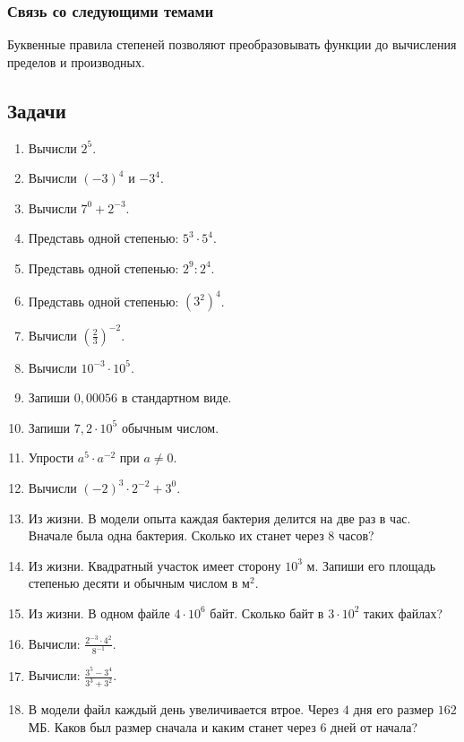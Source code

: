 \documentclass[12pt,a4paper]{article}
\theoremstyle{definition}
\theoremstyle{plain}
\theoremstyle{remark}
\newcommand{\starmark}{\ensuremath{{}^{\ast}}}
\begin{document}
\subsubsection*{Связь со следующими темами}
Буквенные правила степеней позволяют преобразовывать функции до вычисления пределов и производных.
\subsection*{Задачи}
\begin{enumerate}[label=\thesection.\arabic*.,leftmargin=2.8em,itemsep=12pt]
\item Вычисли \(2^{5}\).
\item Вычисли \((- 3)^{4}\) и \(- 3^{4}\).
\item Вычисли \(7^{0} + 2^{- 3}\).
\item Представь одной степенью: \(5^{3} \cdot  5^{4}\).
\item Представь одной степенью: \(2^{9} : 2^{4}\).
\item Представь одной степенью: \((3^{2})^{4}\).
\item Вычисли \((\frac{2}{3})^{- 2}\).
\item Вычисли \(10^{- 3} \cdot  10^{5}\).
\item Запиши \(0{,}00056\) в стандартном виде.
\item Запиши \(7{,}2 \cdot  10^{5}\) обычным числом.
\item Упрости \(a^{5} \cdot  a^{- 2}\) при \(a \ne  0\).
\item Вычисли \((- 2)^{3} \cdot  2^{- 2} + 3^{0}\).
\item Из жизни. В модели опыта каждая бактерия делится на две раз в час. Вначале была одна бактерия. Сколько их станет через \(8\) часов?
\item Из жизни. Квадратный участок имеет сторону \(10^{3}\) м. Запиши его площадь степенью десяти и обычным числом в м\(^{2}\).
\item Из жизни. В одном файле \(4 \cdot  10^{6}\) байт. Сколько байт в \(3 \cdot  10^{2}\) таких файлах?
\item[\textbf{6.16.}\starmark] Вычисли: \(\frac{2^{- 3} \cdot  4^{2}}{8^{- 1}}\).
\item[\textbf{6.17.}\starmark] Вычисли: \(\frac{3^{5} - 3^{4}}{3^{3} + 3^{2}}\).
\item[\textbf{6.18.}\starmark] В модели файл каждый день увеличивается втрое. Через \(4\) дня его размер \(162\) МБ. Каков был размер сначала и каким станет через \(6\) дней от начала?
\end{enumerate}
\clearpage
\end{document}
